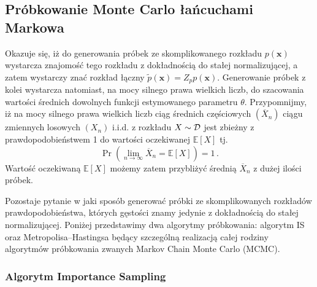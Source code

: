 \documentclass{myclass}
\numberwithin{equation}{subsection}
\begin{document}
\subsection{Próbkowanie Monte Carlo łańcuchami Markowa}

Okazuje się, iż do generowania próbek ze skomplikowanego rozkładu \(p(\bm{x})\) wystarcza znajomość
tego rozkładu z dokładnością do stałej normalizującej, a zatem wystarczy znać rozkład łączny
\(\tilde{p}(\bm{x}) = Z_p p(\bm{x})\). Generowanie próbek z kolei wystarcza natomiast, na mocy
silnego prawa wielkich liczb, do szacowania wartości średnich dowolnych funkcji estymowanego
parametru \(\theta\). Przypomnijmy, iż na mocy silnego prawa wielkich liczb ciąg średnich
częściowych \((\overline{X}_n)\) ciągu zmiennych losowych \((X_n)\) i.i.d. z rozkładu \(X \sim
\mathcal{D}\) jest zbieżny z prawdopodobieństwem 1 do wartości oczekiwanej \(\mathbb{E}[X]\) tj.
\begin{equation}
    \Pr\left(\lim_{n \to \infty} \overline{X}_n = \mathbb{E}[X]\right) = 1\,.
\end{equation}
Wartość oczekiwaną \(\mathbb{E}[X]\) możemy zatem przybliżyć średnią \(\overline{X}_n\) z dużej
ilości próbek.

Pozostaje pytanie w jaki sposób generować próbki ze skomplikowanych rozkładów prawdopodobieństwa,
których gęstości znamy jedynie z dokładnością do stałej normalizującej. Poniżej przedstawimy dwa
algorytmy próbkowania: algorytm IS oraz Metropolisa--Hastingsa będący szczególną realizacją całej
rodziny algorytmów próbkowania zwanych Markov Chain Monte Carlo (MCMC).

\subsubsection{Algorytm Importance Sampling}
\end{document}
